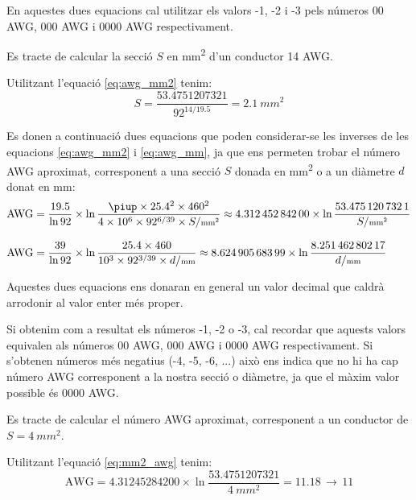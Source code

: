 En aquestes dues equacions cal utilitzar els valors -1, -2 i -3  pels números 00 AWG,
000 AWG i 0000 AWG respectivament.

\begin{exemple}
    Es tracte de calcular la secció $S$ en \si{mm^2} d'un conductor 14 AWG.

    Utilitzant l'equació \eqref{eq:awg_mm2} tenim:
    \[
        S = \dfrac{\num{53,4751207321}}{92^{14/\num{19,5}}} = \SI{2,1}{mm^2}
    \]
\end{exemple}


Es donen a continuació dues equacions que poden considerar-se les inverses de les equacions \eqref{eq:awg_mm2} i \eqref{eq:awg_mm}, ja que ens permeten trobar el número AWG aproximat, corresponent a una secció $S$ donada en \si{mm^2} o a un diàmetre $d$ donat en \si{mm}:
\begin{align}
   \text{AWG} &= \frac{\num{19,5}}{\ln 92} \times \ln \frac{\piup \times
   \num{25,4}^2 \times 460^2}{4 \times 10^6 \times 92^{6/39} \times S/{\scriptstyle\si{mm^2}}} \approx
   \num{4,31245284200} \times \ln \frac{\num{53,4751207321}}{S/{\scriptstyle\si{mm^2}}}\label{eq:mm2_awg} \\[2ex]
   \text{AWG} &= \frac{39}{\ln 92} \times \ln \frac{\num{25,4} \times 460}{10^3 \times 92^{3/39} \times d/{\scriptstyle\si{mm}}} \approx
   \num{8,62490568399} \times \ln \frac{\num{8,25146280217}}{d/{\scriptstyle\si{mm}}}\label{eq:mm_awg}
\end{align}

Aquestes dues equacions ens donaran en general un valor decimal que caldrà arrodonir al valor enter  més proper.

Si obtenim com a resultat els números -1, -2 o -3, cal recordar que aquests valors equivalen als números 00 AWG,
000 AWG i 0000 AWG respectivament. Si s'obtenen números més negatius (-4, -5, -6, ...) això ens indica que no hi ha cap número AWG corresponent a la nostra secció o diàmetre, ja que el màxim valor possible és 0000 AWG.

\begin{exemple}
    Es tracte de calcular el número AWG aproximat, corresponent a un conductor de $S=\SI{4}{mm^2}$.

    Utilitzant l'equació \eqref{eq:mm2_awg} tenim:
    \[
        \text{AWG} = \num{4,31245284200} \times \ln \dfrac{\num{53,4751207321}}{\SI{4}{mm^2}} =
        \num{11,18} \, \rightarrow \, 11
    \]
\end{exemple}

